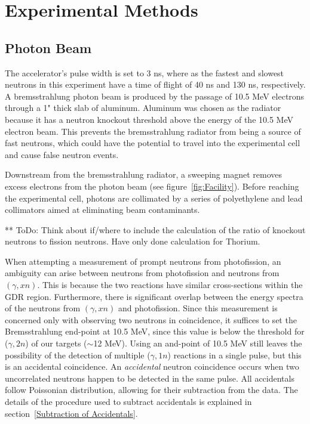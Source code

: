 \section{Experimental Methods}
\subsection{Photon Beam}
The accelerator's pulse width is set to 3 ns, where as the fastest and slowest neutrons in this experiment have a time of flight of 40 ns and 130 ns, respectively. A bremsstrahlung photon beam is produced by the passage of 10.5 MeV electrons through a 1" thick slab of aluminum. Aluminum was chosen as the radiator because it has a neutron knockout threshold above the energy of the 10.5 MeV electron beam. This prevents the bremsstrahlung radiator from being a source of fast neutrons, which could have the potential to travel into the experimental cell and cause false neutron events.

Downstream from the bremsstrahlung radiator, a sweeping magnet removes excess electrons from the photon beam (see figure~\ref{fig:Facility}). Before reaching the experimental cell, photons are collimated by a series of polyethylene and lead collimators aimed at eliminating beam contaminants.

** ToDo: Think about if/where to include the calculation of the ratio of knockout neutrons to fission neutrons. Have only done calculation for Thorium.  

When attempting a measurement of prompt neutrons from photofission, an ambiguity can arise between neutrons from photofission and neutrons from $(\gamma, xn)$. This is because the two reactions have similar cross-sections within the GDR region. Furthermore, there is significant overlap between the energy spectra of the neutrons from $(\gamma, xn)$ and photofission. Since this measurement is concerned only with observing two neutrons in coincidence, it suffices to set the Bremsstrahlung end-point at 10.5 MeV, since this value is below the threshold for ($\gamma, 2n$) of our targets ($\sim$12 MeV). Using an and-point of 10.5 MeV still leaves the possibility of the detection of multiple ($\gamma, 1n$) reactions in a single pulse, but this is an accidental coincidence. An \textit{accidental} neutron coincidence occurs when two uncorrelated neutrons happen to be detected in the same pulse. All accidentals follow Poissonian distribution, allowing for their subtraction from the data. The details of the procedure used to subtract accidentals is explained in section~\ref{Subtraction of Accidentals}.

